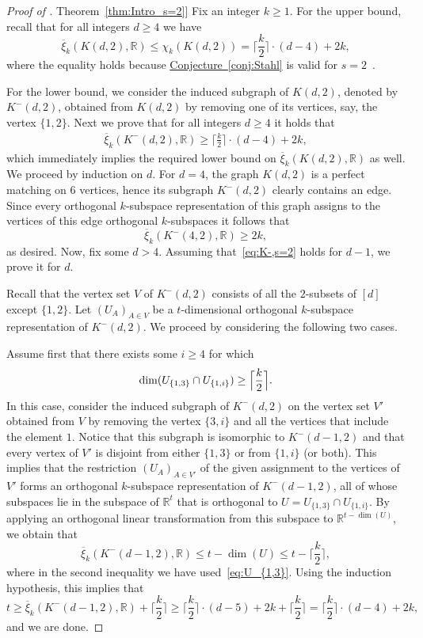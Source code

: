 \documentclass[11pt]{article}
\numberwithin{equation}{section}
\theoremstyle{definition}
\theoremstyle{plain}
\newcommand{\R}{\mathbb R}
\newcommand{\expref}[2]{\hyperref[#2]{#1~\ref{#2}}}
\newcommand{\od}{\overline{\xi}}
\begin{document}
\begin{proof}[Proof of \expref{Theorem}{thm:Intro_s=2}]
Fix an integer $k \geq 1$.
For the upper bound, recall that for all integers $d \geq 4$ we have
\[\od_{k}(K(d,2),\R) \leq \chi_k(K(d,2)) = \Big \lceil \frac{k}{2} \Big \rceil \cdot (d-4)+2k,\]
where the equality holds because \expref{Conjecture}{conj:Stahl} is valid for $s=2$~\cite{Stahl98}.

For the lower bound, we consider the induced subgraph of $K(d,2)$, denoted by $K^{-}(d,2)$, obtained from $K(d,2)$ by removing one of its vertices, say, the vertex $\{1,2\}$.
%
Next we prove  %
that for all integers $d \geq 4$ it holds that
\begin{eqnarray}\label{eq:K-,s=2}
\od_{k}(K^{-}(d,2),\R) \geq \Big \lceil \frac{k}{2} \Big \rceil \cdot (d-4)+2k,
\end{eqnarray}
which immediately implies the required lower bound on $\od_{k}(K(d,2),\R)$ as well.
%
We proceed by  %
induction on $d$.
For $d=4$, the graph $K(d,2)$ is a perfect matching on $6$ vertices, hence its subgraph $K^{-}(d,2)$ clearly contains an edge. Since every orthogonal $k$-subspace representation of this graph assigns to the vertices of this edge orthogonal $k$-subspaces it follows that \[\od_k(K^{-}(4,2),\R) \geq 2k,\]
as desired.
Now, fix some $d > 4$. Assuming that~\eqref{eq:K-,s=2} holds for $d-1$,
we %
prove it for $d$.

Recall that the vertex set $V$ of $K^{-}(d,2)$ consists of all the $2$-subsets of $[d]$ except $\{1,2\}$.
Let $(U_A)_{A \in V}$ be a $t$-dimensional orthogonal $k$-subspace representation of $K^{-}(d,2)$.
We proceed by considering the following two cases.

Assume first that there exists some $i \geq 4$ for which
\begin{eqnarray}\label{eq:U_{1,3}}
\dim(U_{\{1,3\}} \cap U_{\{1,i\}}) \geq \Big\lceil \frac{k}{2} \Big\rceil.
\end{eqnarray}
In this case, consider the induced subgraph of $K^{-}(d,2)$ on the vertex set $V'$ obtained from $V$ by removing the vertex $\{3,i\}$ and all the vertices that include the element $1$.
Notice that this subgraph is isomorphic to $K^{-}(d-1,2)$ and that every vertex of $V'$ is disjoint from either $\{1,3\}$ or from $\{1,i\}$ (or both).
This implies that the restriction $(U_A)_{A \in V'}$ of the given assignment to the vertices of $V'$ forms an orthogonal $k$-subspace representation of $K^{-}(d-1,2)$, all of whose subspaces lie in the subspace of $\R^t$ that is orthogonal to $U = U_{\{1,3\}} \cap U_{\{1,i\}}$.
By applying an orthogonal linear transformation from this subspace to $\R^{t-\dim(U)}$, we obtain that
\[ \od_k(K^{-}(d-1,2),\R) \leq t- \dim(U) \leq t- \Big\lceil \frac{k}{2} \Big\rceil,\]
where in the second inequality we have used~\eqref{eq:U_{1,3}}.
Using the induction hypothesis, this implies that
\[ t \geq \od_k(K^{-}(d-1,2),\R) + \Big\lceil \frac{k}{2} \Big\rceil \geq \Big \lceil \frac{k}{2} \Big \rceil \cdot (d-5)+2k + \Big\lceil \frac{k}{2} \Big\rceil = \Big \lceil \frac{k}{2} \Big \rceil \cdot (d-4)+2k,\]
and we are done.


\end{proof}
\end{document}
